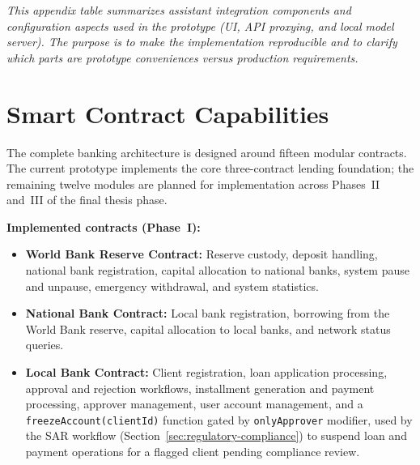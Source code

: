 \documentclass[12pt,a4paper]{report}
\begin{document}
\vspace{2pt}
\noindent\textit{\small This appendix table summarizes assistant integration components and configuration aspects used in the prototype (UI, API proxying, and local model server). The purpose is to make the implementation reproducible and to clarify which parts are prototype conveniences versus production requirements.}

\chapter{Smart Contract Capabilities}

The complete banking architecture is designed around fifteen modular contracts. The current prototype implements the core three-contract lending foundation; the remaining twelve modules are planned for implementation across Phases~II and~III of the final thesis phase.

\textbf{Implemented contracts (Phase~I):}
\begin{itemize}[noitemsep]
\item \textbf{World Bank Reserve Contract:} Reserve custody, deposit handling, national bank registration, capital allocation to national banks, system pause and unpause, emergency withdrawal, and system statistics.
\item \textbf{National Bank Contract:} Local bank registration, borrowing from the World Bank reserve, capital allocation to local banks, and network status queries.
\item \textbf{Local Bank Contract:} Client registration, loan application processing, approval and rejection workflows, installment generation and payment processing, approver management, user account management, and a \texttt{freezeAccount(clientId)} function gated by \texttt{onlyApprover} modifier, used by the SAR workflow (Section~\ref{sec:regulatory-compliance}) to suspend loan and payment operations for a flagged client pending compliance review.
\end{itemize}
\end{document}
